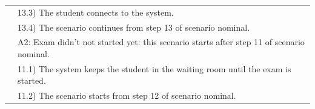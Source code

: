 \documentclass[]{uc2pfecaneva}
\begin{document}
\begin{table}[h]
\begin{tabularx}{\textwidth}{|l|X|}
		                      & \hspace{4mm}13.3) The student connects to the system.                                             \\
		                      & \hspace{4mm}13.4) The scenario continues from step 13 of scenario nominal.                        \\
		                      & A2: Exam didn't not started yet: this scenario starts after step 11 of scenario nominal.          \\
		                      & \hspace{4mm}11.1) The system keeps the student in the waiting room until the exam is started.     \\
		                      & \hspace{4mm}11.2) The scenario starts from step 12 of scenario nominal.                           \\ \hline
	\end{tabularx}

	\label{table:4}
\end{table}
\clearpage
\end{document}
